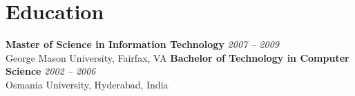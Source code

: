 \documentclass[11pt]{article}
\begin{document}
\section*{Education}
\textbf{Master of Science in Information Technology} \hfill \textit{2007 -- 2009} \\
George Mason University, Fairfax, VA
\newline
\textbf{Bachelor of Technology in Computer Science} \hfill \textit{2002 -- 2006} \\
Osmania University, Hyderabad, India
\end{document}
